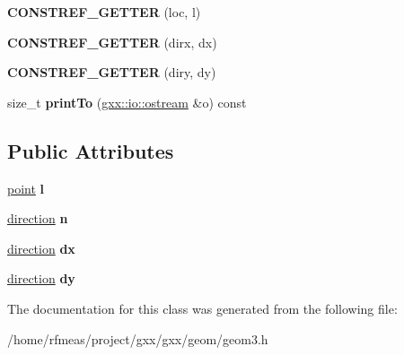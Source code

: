 \begin{DoxyCompactItemize}
\item 
{\bfseries C\+O\+N\+S\+T\+R\+E\+F\+\_\+\+G\+E\+T\+T\+ER} (loc, l)\hypertarget{classgxx_1_1geom3_1_1axis2_ab06da104334da34a74703e3e1e4ac91d}{}\label{classgxx_1_1geom3_1_1axis2_ab06da104334da34a74703e3e1e4ac91d}

\item 
{\bfseries C\+O\+N\+S\+T\+R\+E\+F\+\_\+\+G\+E\+T\+T\+ER} (dirx, dx)\hypertarget{classgxx_1_1geom3_1_1axis2_ae6dda12eb6d1e7bb6443c688dad430f9}{}\label{classgxx_1_1geom3_1_1axis2_ae6dda12eb6d1e7bb6443c688dad430f9}

\item 
{\bfseries C\+O\+N\+S\+T\+R\+E\+F\+\_\+\+G\+E\+T\+T\+ER} (diry, dy)\hypertarget{classgxx_1_1geom3_1_1axis2_a8a39a8b8e3f47ab9f77804fecd070608}{}\label{classgxx_1_1geom3_1_1axis2_a8a39a8b8e3f47ab9f77804fecd070608}

\item 
size\+\_\+t {\bfseries print\+To} (\hyperlink{classgxx_1_1io_1_1ostream}{gxx\+::io\+::ostream} \&o) const \hypertarget{classgxx_1_1geom3_1_1axis2_a1a7d141a3bd974d93b0e34551aac43fd}{}\label{classgxx_1_1geom3_1_1axis2_a1a7d141a3bd974d93b0e34551aac43fd}

\end{DoxyCompactItemize}
\subsection*{Public Attributes}
\begin{DoxyCompactItemize}
\item 
\hyperlink{classgxx_1_1geom3_1_1point}{point} {\bfseries l}\hypertarget{classgxx_1_1geom3_1_1axis2_a8b647f744b39e87341c39ed50c7b04a8}{}\label{classgxx_1_1geom3_1_1axis2_a8b647f744b39e87341c39ed50c7b04a8}

\item 
\hyperlink{classgxx_1_1geom3_1_1direction}{direction} {\bfseries n}\hypertarget{classgxx_1_1geom3_1_1axis2_aad35f7babab12fe7ca80a1e9ff10ce25}{}\label{classgxx_1_1geom3_1_1axis2_aad35f7babab12fe7ca80a1e9ff10ce25}

\item 
\hyperlink{classgxx_1_1geom3_1_1direction}{direction} {\bfseries dx}\hypertarget{classgxx_1_1geom3_1_1axis2_a854199c278119e5f5ff3391bee1cd1cc}{}\label{classgxx_1_1geom3_1_1axis2_a854199c278119e5f5ff3391bee1cd1cc}

\item 
\hyperlink{classgxx_1_1geom3_1_1direction}{direction} {\bfseries dy}\hypertarget{classgxx_1_1geom3_1_1axis2_a9a3f95b98ae9aba91bb3cd50b9668a27}{}\label{classgxx_1_1geom3_1_1axis2_a9a3f95b98ae9aba91bb3cd50b9668a27}

\end{DoxyCompactItemize}


The documentation for this class was generated from the following file\+:\begin{DoxyCompactItemize}
\item 
/home/rfmeas/project/gxx/gxx/geom/geom3.\+h\end{DoxyCompactItemize}

